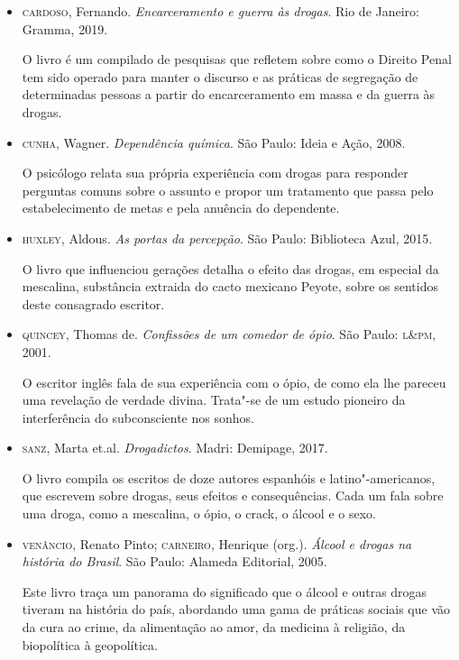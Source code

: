 \documentclass[11pt]{extarticle}
\begin{document}
\begin{itemize}
\item\textsc{cardoso}, Fernando. \textit{Encarceramento e guerra às drogas}. Rio de
Janeiro: Gramma, 2019.

O livro é um compilado de pesquisas que refletem sobre como o Direito
Penal tem sido operado para manter o discurso e as práticas de
segregação de determinadas pessoas a partir do encarceramento em massa e
da guerra às drogas.

\item\textsc{cunha}, Wagner. \textit{Dependência química}. São Paulo: Ideia e Ação,
2008.

O psicólogo relata sua própria experiência com drogas para responder
perguntas comuns sobre o assunto e propor um tratamento que passa pelo
estabelecimento de metas e pela anuência do dependente.

\item\textsc{huxley}, Aldous. \textit{As portas da percepção}. São Paulo: Biblioteca
Azul, 2015.

O livro que influenciou gerações detalha o efeito das drogas, em especial da mescalina, substância extraida do cacto mexicano Peyote, sobre os
sentidos deste consagrado escritor.

\item\textsc{quincey}, Thomas de. \textit{Confissões de um comedor de ópio}. São Paulo: \textsc{l\&pm}, 2001.

O escritor inglês fala de sua experiência com o ópio, de como ela lhe
pareceu uma revelação de verdade divina. Trata"-se de um estudo pioneiro
da interferência do subconsciente nos sonhos.

\item\textsc{sanz}, Marta et.al. \textit{Drogadictos}. Madri: Demipage, 2017.

O livro compila os escritos de doze autores espanhóis e
latino"-americanos, que escrevem sobre drogas, seus efeitos e
consequências. Cada um fala sobre uma droga, como a mescalina, o ópio, o
crack, o álcool e o sexo.

\item\textsc{venâncio}, Renato Pinto; \textsc{carneiro}, Henrique (org.). \textit{Álcool e drogas na história do Brasil}. São Paulo: Alameda Editorial, 2005.

Este livro traça um panorama do significado que o álcool e outras drogas
tiveram na história do país, abordando uma gama de práticas sociais que
vão da cura ao crime, da alimentação ao amor, da medicina à religião, da
biopolítica à geopolítica.
\end{itemize}
\end{document}
